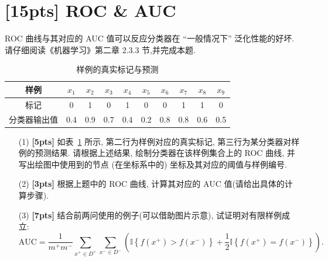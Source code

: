 \documentclass[a4paper,UTF8]{article}
\numberwithin{equation}{section}
\theoremstyle{definition}
\begin{document}
	\newpage
	
	\section{[15pts] ROC \& AUC}
	ROC 曲线与其对应的 AUC 值可以反应分类器在 “一般情况下” 泛化性能的好坏. 请仔细阅读《机器学习》第二章 2.3.3 节,并完成本题.
	\begin{table}[ht]
		\centering
		\caption{样例的真实标记与预测}
		\begin{tabular}{c|ccccccccc}
			\hline 样例 & $x_1$ & $x_2$ & $x_3$ & $x_4$ & $x_5$ & $x_6$ & $x_7$ & $x_8$ & $x_9$ \\
			\hline 标记 & 0 & 1 & 0 & 1 & 0 & 0 & 1 & 1 & 0 \\
			\hline 分类器输出值 & 0.4 & 0.9 & 0.7 & 0.4 & 0.2 & 0.8 & 0.8 & 0.6 & 0.5 \\
			\hline
		\end{tabular}
		\label{tab:samples}
	\end{table} 
	\begin{enumerate}
		\item[(1)] \textbf{[5pts]}  如表~\ref{tab:samples} 所示, 第二行为样例对应的真实标记, 第三行为某分类器对样例的预测结果. 请根据上述结果, 绘制分类器在该样例集合上的 ROC 曲线, 并写出绘图中使用到的节点 (在坐标系中的) 坐标及其对应的阈值与样例编号.
		\item[(2)] \textbf{[3pts]}  根据上题中的 ROC 曲线, 计算其对应的 AUC 值(请给出具体的计算步骤).
		\item[(3)] \textbf{[7pts]}  结合前两问使用的例子(可以借助图片示意), 试证明对有限样例成立:
		\begin{equation}
			\label{eq:auc}
			\text{AUC} = \frac{1}{m^+m^-}\sum_{x^+\in D^+}\sum_{x^-\in D^-}\left(\mathbb{I}\left\{f(x^+) > f(x^-)\right\}+\frac{1}{2}\mathbb{I}\left\{f(x^+)=f(x^-)\right\}\right).
		\end{equation}    
	\end{enumerate}
\end{document}
